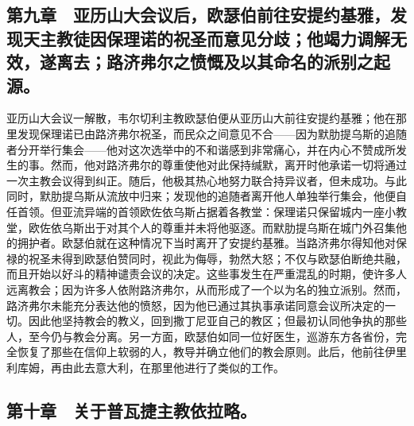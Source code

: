 
\subsection{第九章　亚历山大会议后，欧瑟伯前往安提约基雅，发现天主教徒因保理诺的祝圣而意见分歧；他竭力调解无效，遂离去；路济弗尔之愤慨及以其命名的派别之起源。}

亚历山大会议一解散，韦尔切利主教欧瑟伯便从亚历山大前往安提约基雅；他在那里发现保理诺已由路济弗尔祝圣，而民众之间意见不合——因为默肋提乌斯的追随者分开举行集会——他对这次选举中的不和谐感到非常痛心，并在内心不赞成所发生的事。然而，他对路济弗尔的尊重使他对此保持缄默，离开时他承诺一切将通过一次主教会议得到纠正。随后，他极其热心地努力联合持异议者，但未成功。与此同时，默肋提乌斯从流放中归来；发现他的追随者离开他人单独举行集会，他便自任首领。但亚流异端的首领欧佐依乌斯占据着各教堂：保理诺只保留城内一座小教堂，欧佐依乌斯出于对其个人的尊重并未将他驱逐。而默肋提乌斯在城门外召集他的拥护者。欧瑟伯就在这种情况下当时离开了安提约基雅。当路济弗尔得知他对保禄的祝圣未得到欧瑟伯赞同时，视此为侮辱，勃然大怒；不仅与欧瑟伯断绝共融，而且开始以好斗的精神谴责会议的决定。这些事发生在严重混乱的时期，使许多人远离教会；因为许多人依附路济弗尔，从而形成了一个以为名的独立派别。然而，路济弗尔未能充分表达他的愤怒，因为他已通过其执事承诺同意会议所决定的一切。因此他坚持教会的教义，回到撒丁尼亚自己的教区；但最初认同他争执的那些人，至今仍与教会分离。另一方面，欧瑟伯如同一位好医生，巡游东方各省份，完全恢复了那些在信仰上软弱的人，教导并确立他们的教会原则。此后，他前往伊里利库姆，再由此去意大利，在那里他进行了类似的工作。\par


\subsection{第十章　关于普瓦捷主教依拉略。}

